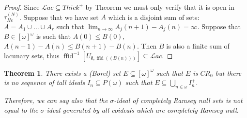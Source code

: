 \documentclass[12pt]{amsart}
\theoremstyle{plain}
\newtheorem{theorem}{Theorem}[section]
\theoremstyle{definition}
\theoremstyle{remark}
\newcommand{\infsub}{[\omega]^{\omega}}
\newcommand{\idealLacunary}{\mathcal{L}\mathit{ac}}
\newcommand{\Thick}{{\mathit Thick}}
\newcommand{\ThickPlus}{{\Thick}^+}
\newcommand{\Hechler}[2]{U_{#1,#2}}
\newcommand{\HechlerNative}{\tau_{\mathit{He}}^{(N)}}
\DeclareMathOperator{\ffid}{ffid}
\begin{document}
\begin{proof}
  Since $\idealLacunary \subseteq \ThickPlus$ by Theorem \label{sigma-porous-is-not-Hechler-open}
we must only verify that it is open in $\HechlerNative$. Suppose that
we have set $A$ which is a disjoint sum of sets: $A = A_1 \cup\ldots\cup A_r$
such that $\lim_{n\to\infty} A_j(n + 1) - A_j(n) = \infty$.
Suppose that $B \in \infsub$ is such that
$A(0) \leq B(0)$, $A(n + 1) - A(n) \leq B(n + 1) - B(n)$.
Then $B$ is also a finite sum of lacunary sets,
thus $\ffid^{-1}[\Hechler{\emptyset}{\ffid((B(n)))}] \subseteq \idealLacunary$.
\end{proof}

\begin{theorem}
There exists a (Borel) set $E \subseteq \infsub$
such that $E$ is $CR_0$ but there is no
sequence of tall ideals $I_n \subseteq P(\omega)$
such that $E \subseteq \bigcup_{n\in\omega} I_n^+$.

Therefore, we can say also that the $\sigma$-ideal
of completely Ramsey null sets is not equal to the
$\sigma$-ideal generated by all coideals
which are completely Ramsey null.
\end{theorem}
\end{document}

